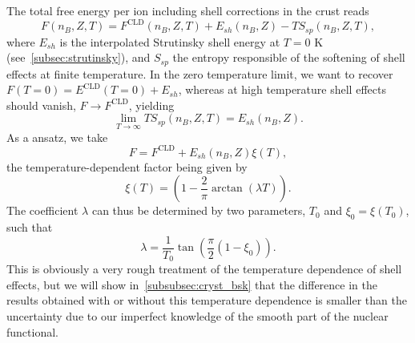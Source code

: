 The total free energy per ion including shell corrections in the crust reads
%
\begin{equation}
  F(n_B,Z,T) = F^{\text{CLD}}(n_B,Z,T) + E_{sh}(n_B,Z) 
  - TS_{sp}(n_B,Z,T),
\end{equation}
%
where $E_{sh}$ is the interpolated Strutinsky shell energy at $T=0$ K
(see~\ref{subsec:strutinsky}), and $S_{sp}$ the entropy responsible of the 
softening of shell effects at finite temperature. 
In the zero temperature limit, we want to recover 
$F(T=0) = E^{\text{CLD}}(T=0) + E_{sh}$, whereas at high
temperature shell effects should vanish, $F \rightarrow 
F^{\text{CLD}}$, yielding
%
\begin{equation}
  \lim_{T\rightarrow \infty} T S_{sp}(n_B,Z,T) = E_{sh}(n_B,Z).
\end{equation}
%
As a ansatz, we take
%
%
\begin{equation}
  F = F^{\text{CLD}} + E_{sh}(n_B,Z)\xi(T),
\end{equation}
%
the temperature-dependent factor being given by
%
\begin{equation}
  \xi(T) = \left(1-\frac{2}{\pi}\arctan(\lambda T)\right).
\end{equation}
%
The coefficient $\lambda$ can thus be determined by two parameters, $T_0$ and
$\xi_0 = \xi(T_0)$, such that
%
\begin{equation}
  \lambda = \frac{1}{T_0}\tan\left(\frac{\pi}{2}(1-\xi_0)\right).
\end{equation}
%
This is obviously a very rough treatment of the temperature dependence of shell 
effects, but we will show in~\ref{subsubsec:cryst_bsk} that the difference in 
the results obtained with or without this temperature dependence is smaller 
than the uncertainty due to our imperfect knowledge of the smooth part of the 
nuclear functional.
 
